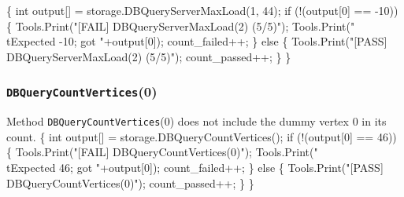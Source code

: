 \documentclass{article}
\def\nwendcode{\endtrivlist \endgroup}
\let\nwdocspar=\par
\begin{document}
\nwenddocs{}\endmoddef{}
\{
  int output[] = storage.DBQueryServerMaxLoad(1, 44);
  if (!(output[0] == -10)) \{
    Tools.Print("[FAIL] DBQueryServerMaxLoad(2) (5/5)");
    Tools.Print("\\tExpected -10; got "+output[0]);
    count_failed++;
  \} else \{
    Tools.Print("[PASS] DBQueryServerMaxLoad(2) (5/5)");
    count_passed++;
  \}
\}
\nwendcode{}\nwdocspar
\subsubsection{{\tt{}DBQueryCountVertices}(0)}
Method {\tt{}DBQueryCountVertices}(0) does not include the dummy vertex 0 in its
count.
\nwenddocs{}\endmoddef{}
\{
  int output[] = storage.DBQueryCountVertices();
  if (!(output[0] == 46)) \{
    Tools.Print("[FAIL] DBQueryCountVertices(0)");
    Tools.Print("\\tExpected 46; got "+output[0]);
    count_failed++;
  \} else \{
    Tools.Print("[PASS] DBQueryCountVertices(0)");
    count_passed++;
  \}
\}
\nwendcode{}\nwdocspar
\end{document}
